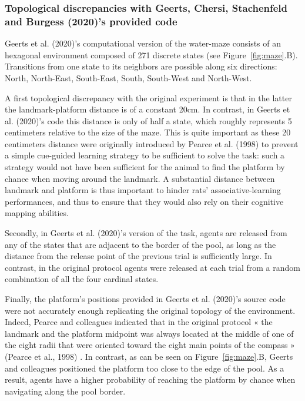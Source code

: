 \subsubsection{Topological discrepancies with Geerts, Chersi, Stachenfeld and Burgess (2020)'s provided code}
Geerts et al. (2020)'s computational version of the water-maze consists of an hexagonal environment composed of 271 discrete states (see Figure~\ref{fig:maze}.B). Transitions from one state to its neighbors are possible along six directions: North, North-East, South-East, South, South-West and North-West. 

A first topological discrepancy with the original experiment is that in the latter the landmark-platform distance is of a constant 20cm. In contrast, in Geerts et al. (2020)’s code this distance is only of half a state, which roughly represents 5 centimeters relative to the size of the maze. This is quite important as these 20 centimeters distance were originally introduced by Pearce et al. (1998) to prevent a simple cue-guided learning strategy to be sufficient to solve the task: such a strategy would not have been sufficient for the animal to find the platform by chance when moving around the landmark. A substantial distance between landmark and platform is thus important to hinder rats’ associative-learning performances, and thus to ensure that they would also rely on their cognitive mapping abilities. 

Secondly, in Geerts et al. (2020)’s version of the task, agents are released from any of the states that are adjacent to the border of the pool, as long as the distance from the release point of the previous trial is sufficiently large. In contrast, in the original protocol agents were released at each trial from a random combination of all the four cardinal states.

Finally, the platform's positions provided in Geerts et al. (2020)’s source code were not accurately enough replicating the original topology of the environment. Indeed, Pearce and colleagues indicated that in the original protocol « the landmark and the platform midpoint was always located at the middle of one of the eight radii that were oriented toward the eight main points of the compass » (Pearce et al., 1998) \cite{Pearce:1998}. In contrast, as can be seen on Figure~\ref{fig:maze}.B, Geerts and colleagues positioned the platform too close to the edge of the pool. As a result, agents have a higher probability of reaching the platform by chance when navigating along the pool border.

